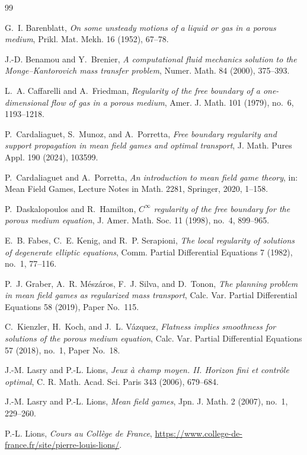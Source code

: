 \documentclass[11pt]{amsart}
\begin{document}
\begin{thebibliography}{99}

G.~I. Barenblatt,
\emph{On some unsteady motions of a liquid or gas in a porous medium},
Prikl. Mat. Mekh. 16 (1952), 67--78.

J.-D. Benamou and Y.~Brenier,
\emph{A computational fluid mechanics solution to the Monge--Kantorovich mass
transfer problem},
Numer. Math. 84 (2000), 375--393.

L.~A. Caffarelli and A.~Friedman,
\emph{Regularity of the free boundary of a one-dimensional flow of gas in a
porous medium},
Amer. J. Math. 101 (1979), no.~6, 1193--1218.

P.~Cardaliaguet, S.~Munoz, and A.~Porretta,
\emph{Free boundary regularity and support propagation in mean field games and
optimal transport},
J. Math. Pures Appl. 190 (2024), 103599.

P.~Cardaliaguet and A.~Porretta,
\emph{An introduction to mean field game theory},
in: Mean Field Games, Lecture Notes in Math. 2281, Springer, 2020, 1--158.

P.~Daskalopoulos and R.~Hamilton,
\emph{$C^\infty$ regularity of the free boundary for the porous medium
equation},
J. Amer. Math. Soc. 11 (1998), no.~4, 899--965.

E.~B. Fabes, C.~E. Kenig, and R.~P. Serapioni,
\emph{The local regularity of solutions of degenerate elliptic equations},
Comm. Partial Differential Equations 7 (1982), no.~1, 77--116.

P.~J. Graber, A.~R. M\'esz\'aros, F.~J. Silva, and D.~Tonon,
\emph{The planning problem in mean field games as regularized mass transport},
Calc. Var. Partial Differential Equations 58 (2019), Paper No.~115.

C.~Kienzler, H.~Koch, and J.~L. V\'azquez,
\emph{Flatness implies smoothness for solutions of the porous medium
equation},
Calc. Var. Partial Differential Equations 57 (2018), no.~1, Paper No.~18.

J.-M. Lasry and P.-L. Lions,
\emph{Jeux \`a champ moyen. II. Horizon fini et contr\^ole optimal},
C. R. Math. Acad. Sci. Paris 343 (2006), 679--684.

J.-M. Lasry and P.-L. Lions,
\emph{Mean field games},
Jpn. J. Math. 2 (2007), no.~1, 229--260.

P.-L. Lions,
\emph{Cours au Coll\`ege de France},
\url{https://www.college-de-france.fr/site/pierre-louis-lions/}.


\end{thebibliography}
\end{document}
